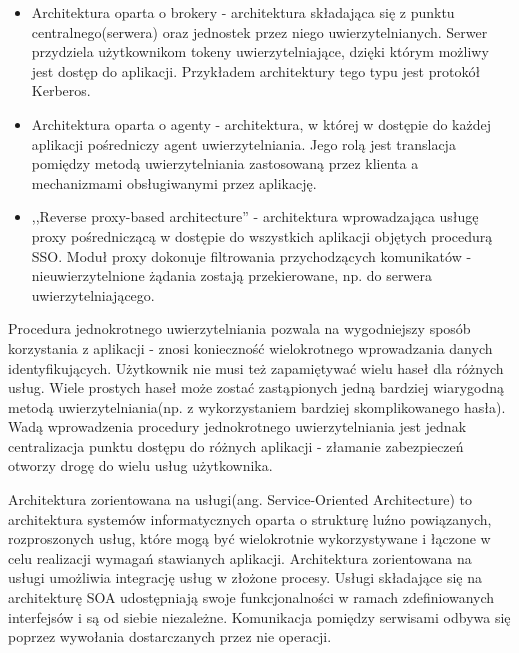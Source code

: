 		\begin{itemize}
		  \item Architektura oparta o brokery - architektura składająca się z punktu centralnego(serwera) oraz jednostek przez niego uwierzytelnianych. Serwer przydziela użytkownikom tokeny uwierzytelniające, dzięki którym możliwy jest dostęp do aplikacji. Przykładem architektury tego typu jest protokół Kerberos. 
		  \item Architektura oparta o agenty - architektura, w której w dostępie do każdej aplikacji pośredniczy agent uwierzytelniania. Jego rolą jest translacja pomiędzy metodą uwierzytelniania zastosowaną przez klienta a mechanizmami obsługiwanymi przez aplikację.
		  \item ,,Reverse proxy-based architecture'' - architektura wprowadzająca usługę proxy pośredniczącą w dostępie do wszystkich aplikacji objętych procedurą SSO. Moduł proxy dokonuje filtrowania przychodzących komunikatów - nieuwierzytelnione żądania zostają przekierowane, np. do serwera uwierzytelniającego.
		\end{itemize}
		  
		Procedura jednokrotnego uwierzytelniania pozwala na wygodniejszy sposób korzystania z aplikacji - znosi konieczność wielokrotnego wprowadzania danych identyfikujących. Użytkownik nie musi też zapamiętywać wielu haseł dla różnych usług. Wiele prostych haseł może zostać zastąpionych jedną bardziej wiarygodną metodą uwierzytelniania(np. z wykorzystaniem bardziej skomplikowanego hasła). Wadą wprowadzenia procedury jednokrotnego uwierzytelniania jest jednak centralizacja punktu dostępu do różnych aplikacji - złamanie zabezpieczeń otworzy drogę do wielu usług użytkownika.


\label{sec:soa}

	Architektura zorientowana na usługi(ang. Service-Oriented Architecture) to architektura systemów informatycznych oparta o strukturę luźno powiązanych, rozproszonych usług, które mogą być wielokrotnie wykorzystywane i łączone w celu realizacji wymagań stawianych aplikacji. Architektura zorientowana na usługi umożliwia integrację usług w złożone procesy\cite{Lawler08}. Usługi składające się na architekturę SOA udostępniają swoje  funkcjonalności w ramach zdefiniowanych interfejsów i są od siebie niezależne. Komunikacja pomiędzy serwisami odbywa się poprzez wywołania dostarczanych przez nie operacji\cite{Papazoglou07}. 

